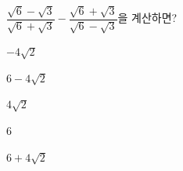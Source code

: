 $\dfrac{\sqrt{6}-\sqrt{3}}{\sqrt{6}+\sqrt{3}}-\dfrac{\sqrt{6}+\sqrt{3}}{\sqrt{6}-\sqrt{3}}$을 계산하면?
\begin{choices32}{\rule[-3ex]{0pt}{8ex}$-4\sqrt{2}$}{\rule[-3ex]{0pt}{8ex}$6-4\sqrt{2}$}{\rule[-3ex]{0pt}{8ex}$4\sqrt{2}$}{\rule[-3ex]{0pt}{8ex}$6$}{\rule[-3ex]{0pt}{8ex}$6+4\sqrt{2}$}\end{choices32}
